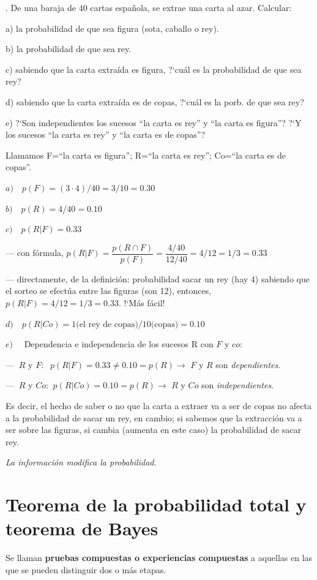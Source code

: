 \begin{example}
.	De una baraja de 40 cartas española, se extrae una carta al azar. Calcular: 

a) la probabilidad de que sea figura (sota, caballo o rey).

b) la probabilidad de que sea rey.

c) sabiendo que la carta extraída es figura, ?`cuál es la probabilidad de que sea rey?

d) sabiendo que la carta extraída es de copas, ?`cuál es la porb. de que sea rey?

e) ?`Son independientes los sucesos “la carta es rey” y “la carta es figura”? ?`Y los sucesos “la carta es rey” y “la carta es de copas”? 	

\vspace{4mm}

Llamamos F=``la carta es figura''; R=``la carta es rey''; Co=``la carta es de copas''.

$a)\quad p(F)=(3\cdot 4)/40=3/10=0.30$

$b)\quad p(R)=4/40=0.10$

$c)\quad p(R|F)=0.33$

--- con fórmula, $p(R|F)=\dfrac{p(R\cap F)}{p(F)}=\dfrac{4/40}{12/40}=4/12=1/3=0.33$

--- directamente, de la definición: probabilidad sacar un rey (hay 4) sabiendo que el sorteo se efectúa entre las figuras (son 12), entonces, $p(R|F)=4/12=1/3=0.33$. !`Más fácil!

$d)\quad p(R|Co)=1\text{(el rey de copas)}/10\text{(copas)}=0.10$

$e)\quad$ Dependencia e independencia de los sucesos R con $F$ y $co$:

--- $\ R$ y $F$: $\ \ p(R|F)=0.33 \neq 0.10 = p(R) \to $ $F$ y $R$ son \emph{dependientes}.

--- $\ R$ y $Co$: $\ p(R|Co)=0.10 = p(R) \to $ $R$ y $Co$ son \emph{independientes}.

Es decir, el hecho de saber o no que la carta a extraer va a ser de copas no afecta a la probabilidad de sacar un rey, en cambio; si sabemos que la extracción va a ser sobre las figuras, si cambia (aumenta en este caso) la probabilidad de sacar rey.

\emph{La información modifica la probabilidad.}

\end{example}


\section{Teorema de la probabilidad total y teorema de Bayes}
Se llaman \textbf{pruebas compuestas o experiencias compuestas} a aquellas en las que se pueden distinguir dos o más etapas.

